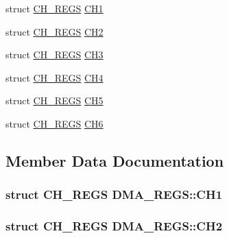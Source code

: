 \begin{DoxyCompactItemize}
\item 
struct \hyperlink{struct_c_h___r_e_g_s}{C\+H\+\_\+\+R\+E\+G\+S} \hyperlink{struct_d_m_a___r_e_g_s_a9b1f91c6edc89261a17b152d016c4eef}{C\+H1}
\item 
struct \hyperlink{struct_c_h___r_e_g_s}{C\+H\+\_\+\+R\+E\+G\+S} \hyperlink{struct_d_m_a___r_e_g_s_a4977685583de6b6df46f4c6a79f534e5}{C\+H2}
\item 
struct \hyperlink{struct_c_h___r_e_g_s}{C\+H\+\_\+\+R\+E\+G\+S} \hyperlink{struct_d_m_a___r_e_g_s_a3a41df23bd86562c20efe2e44f51f828}{C\+H3}
\item 
struct \hyperlink{struct_c_h___r_e_g_s}{C\+H\+\_\+\+R\+E\+G\+S} \hyperlink{struct_d_m_a___r_e_g_s_a8835bb9e0185cd821eedb17e36a27e0a}{C\+H4}
\item 
struct \hyperlink{struct_c_h___r_e_g_s}{C\+H\+\_\+\+R\+E\+G\+S} \hyperlink{struct_d_m_a___r_e_g_s_ab036e997a1f2d95a58d567b36824eb1c}{C\+H5}
\item 
struct \hyperlink{struct_c_h___r_e_g_s}{C\+H\+\_\+\+R\+E\+G\+S} \hyperlink{struct_d_m_a___r_e_g_s_a72dbb6a73cf9543c2d4fdf3f270eee4f}{C\+H6}
\end{DoxyCompactItemize}


\subsection{Member Data Documentation}
\hypertarget{struct_d_m_a___r_e_g_s_a9b1f91c6edc89261a17b152d016c4eef}{}
\subsubsection[{C\+H1}]{\setlength{\rightskip}{0pt plus 5cm}struct {\bf C\+H\+\_\+\+R\+E\+G\+S} D\+M\+A\+\_\+\+R\+E\+G\+S\+::\+C\+H1}\label{struct_d_m_a___r_e_g_s_a9b1f91c6edc89261a17b152d016c4eef}
\hypertarget{struct_d_m_a___r_e_g_s_a4977685583de6b6df46f4c6a79f534e5}{}
\subsubsection[{C\+H2}]{\setlength{\rightskip}{0pt plus 5cm}struct {\bf C\+H\+\_\+\+R\+E\+G\+S} D\+M\+A\+\_\+\+R\+E\+G\+S\+::\+C\+H2}\label{struct_d_m_a___r_e_g_s_a4977685583de6b6df46f4c6a79f534e5}
\hypertarget{struct_d_m_a___r_e_g_s_a3a41df23bd86562c20efe2e44f51f828}{}
